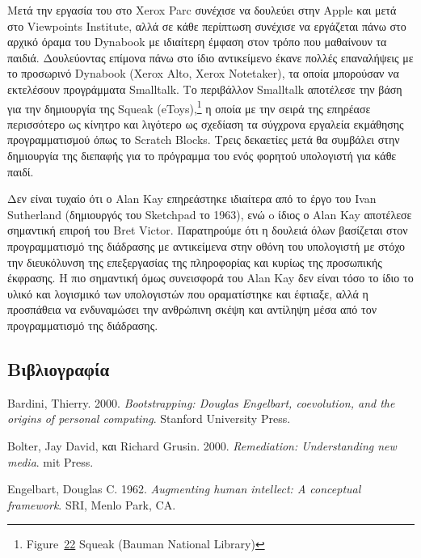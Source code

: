 \documentclass[
]{article}
\newlength{\cslhangindent}
\newlength{\cslentryspacingunit} %
\newenvironment{CSLReferences}[2] %
 {%
  \setlength{\parindent}{0pt}
  \ifodd #1
  \let\oldpar\par
  \def\par{\hangindent=\cslhangindent\oldpar}
  \fi
  \setlength{\parskip}{#2\cslentryspacingunit}
 }%
 {}
\begin{document}
Μετά την εργασία του στο Xerox Parc συνέχισε να δουλεύει στην Apple και
μετά στο Viewpoints Institute, αλλά σε κάθε περίπτωση συνέχισε να
εργάζεται πάνω στο αρχικό όραμα του Dynabook με ιδιαίτερη έμφαση στον
τρόπο που μαθαίνουν τα παιδιά. Δουλεύοντας επίμονα πάνω στο ίδιο
αντικείμενο έκανε πολλές επαναλήψεις με το προσωρινό Dynabook (Xerox
Alto, Xerox Notetaker), τα οποία μπορούσαν να εκτελέσουν προγράμματα
Smalltalk. Το περιβάλλον Smalltalk αποτέλεσε την βάση για την δημιουργία
της Squeak (eToys),\footnote{Figure~\protect\hyperlink{fig:squeakos}{22}
  Squeak (Bauman National Library)} η οποία με την σειρά της επηρέασε
περισσότερο ως κίνητρο και λιγότερο ως σχεδίαση τα σύγχρονα εργαλεία
εκμάθησης προγραμματισμού όπως το Scratch Blocks. Τρεις δεκαετίες μετά
θα συμβάλει στην δημιουργία της διεπαφής για το πρόγραμμα του ενός
φορητού υπολογιστή για κάθε παιδί.

Δεν είναι τυχαίο ότι ο Alan Kay επηρεάστηκε ιδιαίτερα από το έργο του
Ivan Sutherland (δημιουργός του Sketchpad το 1963), ενώ o ίδιος ο Alan
Kay αποτέλεσε σημαντική επιροή του Bret Victor. Παρατηρούμε ότι η
δουλειά όλων βασίζεται στον προγραμματισμό της διάδρασης με αντικείμενα
στην οθόνη του υπολογιστή με στόχο την διευκόλυνση της επεξεργασίας της
πληροφορίας και κυρίως της προσωπικής έκφρασης. Η πιο σημαντική όμως
συνεισφορά του Alan Kay δεν είναι τόσο το ίδιο το υλικό και λογισμικό
των υπολογιστών που οραματίστηκε και έφτιαξε, αλλά η προσπάθεια να
ενδυναμώσει την ανθρώπινη σκέψη και αντίληψη μέσα από τον προγραμματισμό
της διάδρασης.

\hypertarget{ux3b2ux3b9ux3b2ux3bbux3b9ux3bfux3b3ux3c1ux3b1ux3c6ux3afux3b1}{%
\subsection*{Βιβλιογραφία}\label{ux3b2ux3b9ux3b2ux3bbux3b9ux3bfux3b3ux3c1ux3b1ux3c6ux3afux3b1}}

\hypertarget{refs}{}
\begin{CSLReferences}{0}{0}
\end{CSLReferences}

Bardini, Thierry. 2000. \emph{Bootstrapping: Douglas Engelbart,
coevolution, and the origins of personal computing}. Stanford University
Press.

Bolter, Jay David, και Richard Grusin. 2000. \emph{Remediation:
Understanding new media}. mit Press.

Engelbart, Douglas C. 1962. \emph{Augmenting human intellect: A
conceptual framework}. SRI, Menlo Park, CA.
\end{document}
